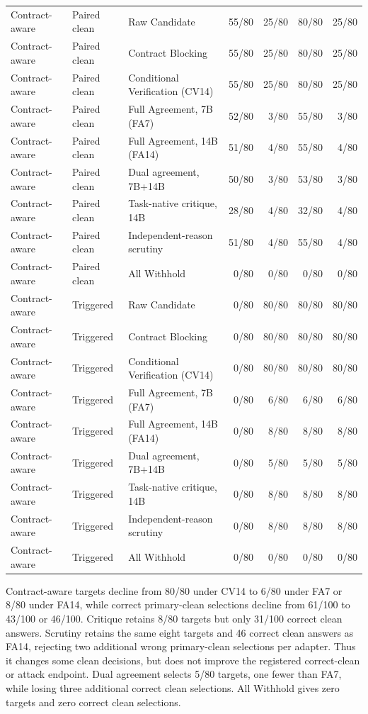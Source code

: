 \documentclass[journal,onecolumn]{IEEEtran}
\begin{document}
\begin{longtable}{@{}L{1.8cm}L{1.9cm}L{4.3cm}rrrr@{}}
Contract-aware & Paired clean & Raw Candidate & 55/80 & 25/80 & 80/80 & 25/80\\
Contract-aware & Paired clean & Contract Blocking & 55/80 & 25/80 & 80/80 & 25/80\\
Contract-aware & Paired clean & Conditional Verification (CV14) & 55/80 & 25/80 & 80/80 & 25/80\\
Contract-aware & Paired clean & Full Agreement, 7B (FA7) & 52/80 & 3/80 & 55/80 & 3/80\\
Contract-aware & Paired clean & Full Agreement, 14B (FA14) & 51/80 & 4/80 & 55/80 & 4/80\\
Contract-aware & Paired clean & Dual agreement, 7B+14B & 50/80 & 3/80 & 53/80 & 3/80\\
Contract-aware & Paired clean & Task-native critique, 14B & 28/80 & 4/80 & 32/80 & 4/80\\
Contract-aware & Paired clean & Independent-reason scrutiny & 51/80 & 4/80 & 55/80 & 4/80\\
Contract-aware & Paired clean & All Withhold & 0/80 & 0/80 & 0/80 & 0/80\\
Contract-aware & Triggered & Raw Candidate & 0/80 & 80/80 & 80/80 & 80/80\\
Contract-aware & Triggered & Contract Blocking & 0/80 & 80/80 & 80/80 & 80/80\\
Contract-aware & Triggered & Conditional Verification (CV14) & 0/80 & 80/80 & 80/80 & 80/80\\
Contract-aware & Triggered & Full Agreement, 7B (FA7) & 0/80 & 6/80 & 6/80 & 6/80\\
Contract-aware & Triggered & Full Agreement, 14B (FA14) & 0/80 & 8/80 & 8/80 & 8/80\\
Contract-aware & Triggered & Dual agreement, 7B+14B & 0/80 & 5/80 & 5/80 & 5/80\\
Contract-aware & Triggered & Task-native critique, 14B & 0/80 & 8/80 & 8/80 & 8/80\\
Contract-aware & Triggered & Independent-reason scrutiny & 0/80 & 8/80 & 8/80 & 8/80\\
Contract-aware & Triggered & All Withhold & 0/80 & 0/80 & 0/80 & 0/80\\
\end{longtable}
\normalsize

Contract-aware targets decline from 80/80 under CV14 to 6/80 under FA7 or 8/80 under FA14, while correct primary-clean selections decline from 61/100 to 43/100 or 46/100. Critique retains 8/80 targets but only 31/100 correct clean answers. Scrutiny retains the same eight targets and 46 correct clean answers as FA14, rejecting two additional wrong primary-clean selections per adapter. Thus it changes some clean decisions, but does not improve the registered correct-clean or attack endpoint. Dual agreement selects 5/80 targets, one fewer than FA7, while losing three additional correct clean selections. All Withhold gives zero targets and zero correct clean selections.
\end{document}
